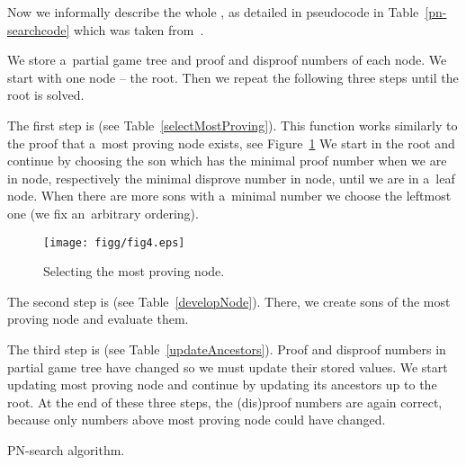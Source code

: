 Now we informally describe the whole , as detailed in pseudocode in
Table~\ref{pn-searchcode} which was taken from~\cite{allis}.

We store a~partial game tree and proof and disproof numbers of each node. We
start with one node -- the root. Then we repeat the following three steps
until the root is solved. 

\medskip

The first step is  (see Table~\ref{selectMostProving}). This function works similarly to the proof that 
a~most proving node exists, see Figure~\ref{pet} We start in the root and continue by
choosing the son which has the minimal proof number when we are in 
node, respectively the minimal disprove number in  node, until we are
in a~leaf node. When there are more sons with a~minimal number we choose the
leftmost one (we fix an~arbitrary ordering). 

\begin{figure}
	\centerline{\mbox{\texttt{[image: figg/fig4.eps]}}}
	\caption{Selecting the most proving node.}
	\label{pet}
\end{figure}

The second step is  (see Table~\ref{developNode}). There, we create sons of the most proving node and evaluate
them.

The third step is  (see Table~\ref{updateAncestors}). Proof and disproof numbers in partial game tree have
changed so we must update their stored values. We start updating most proving
node and continue by updating its ancestors up to the root. At the end of these
three steps, the (dis)proof numbers are again correct, because only numbers
above most proving node could have changed.

\begin{table}
  \begin{itemize*}
    \item [] 
    \item [] 
    \item [] 
      \begin{itemize*}
      \item [] 
      \item [] 
      \item [] 
      \end{itemize*}
    \item [] 
    \item [] 
    \item [] 
    \item [] 
  \end{itemize*}
\caption{PN-search algorithm.}
\label{pn-searchcode}
\end{table}

